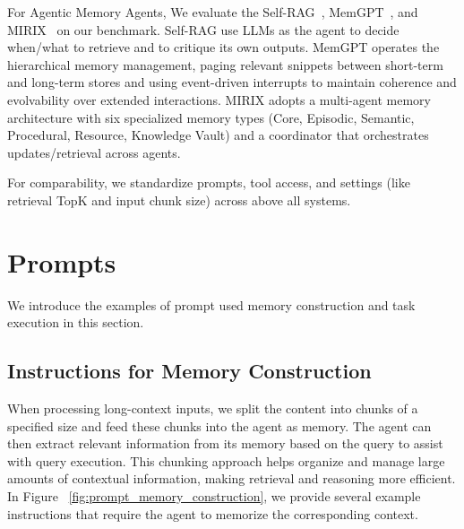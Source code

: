 For Agentic Memory Agents, We evaluate the Self-RAG~\citep{self-rag}, MemGPT~\citep{MemGPT}, and MIRIX~\citep{mirix} on our benchmark. Self-RAG use LLMs as the agent to decide when/what to retrieve and to critique its own outputs. MemGPT operates the hierarchical memory management, paging relevant snippets between short-term and long-term stores and using event-driven interrupts to maintain coherence and evolvability over extended interactions. MIRIX adopts a multi-agent memory architecture with six specialized memory types (Core, Episodic, Semantic, Procedural, Resource, Knowledge Vault) and a coordinator that orchestrates updates/retrieval across agents. 

For comparability, we standardize prompts, tool access, and settings (like retrieval TopK and input chunk size) across above all systems.

\section{Prompts}
\label{sec:prompts}

We introduce the examples of prompt used memory construction and task execution in this section.

\subsection{Instructions for Memory Construction}
\label{sub:instructions_for_memory_construction}

When processing long-context inputs, we split the content into chunks of a specified size and feed these chunks into the agent as memory. The agent can then extract relevant information from its memory based on the query to assist with query execution. This chunking approach helps organize and manage large amounts of contextual information, making retrieval and reasoning more efficient. In Figure ~\ref{fig:prompt_memory_construction}, we provide several example instructions that require the agent to memorize the corresponding context.

